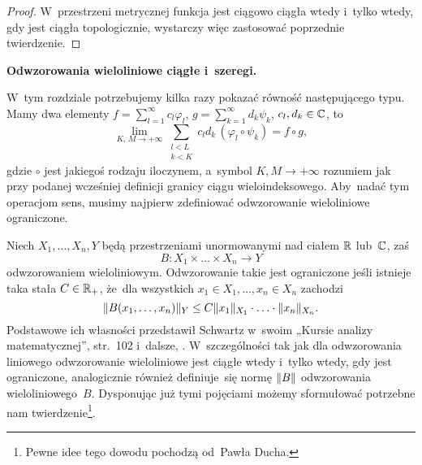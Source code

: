 \documentclass[a4paper,11pt]{article}
\numberwithin{equation}{section}
\begin{document}
\begin{proof}

  W~przestrzeni metrycznej funkcja jest ciągowo ciągła wtedy i~tylko wtedy,
  gdy jest ciągła topologicznie, wystarczy więc zastosować poprzednie
  twierdzenie.

\end{proof}

\VerSpaceFour



\textbf{Odwzorowania wieloliniowe ciągłe i~szeregi.}

W~tym
rozdziale potrzebujemy kilka razy pokazać równość następującego typu.
Mamy dwa elementy $f = \sum_{ l = 1 }^{ \infty } c_{ l } \varphi_{ l }$,
$g = \sum_{ k = 1 }^{ \infty } d_{ k } \psi_{ k }$,
$c_{ l }, d_{ k } \in \mathbb{C}$, to
\begin{equation}
  \label{eq:RS-Vol-I-s02-01}
  \lim\limits_{ K,\, M \to +\infty } \sum_{ \substack{ l < L \\ k < K } }
  c_{ l } d_{ k } \, ( \varphi_{ l } \circ \psi_{ k } ) = f \circ g,
\end{equation}
gdzie $\circ$ jest jakiegoś rodzaju iloczynem, a~symbol
$K, M \to +\infty$ rozumiem jak przy podanej wcześniej definicji
granicy ciągu wieloindeksowego. Aby~nadać tym operacjom sens, musimy
najpierw zdefiniować odwzorowanie wieloliniowe ograniczone.

Niech $X_{ 1 }, \ldots, X_{ n }, Y$ będą przestrzeniami unormowanymi nad
ciałem $\mathbb{R}$ lub~$\mathbb{C}$, zaś
\begin{equation}
  \label{eq:RS-Vol-I-s02-02}
  B: X_{ 1 } \times \ldots \times X_{ n } \to Y
\end{equation}
odwzorowaniem wieloliniowym. Odwzorowanie takie jest ograniczone jeśli
istnieje taka stała $C \in \mathbb{R}_{ + }$, że~dla wszystkich
$x_{ 1 } \in X_{ 1 }, \ldots, x_{ n } \in X_{ n }$ zachodzi
\begin{equation}
  \label{eq:RS-Vol-I-02-03}
  \lVert{  B( x_{ 1 }, \ldots, x_{ n } )  }\rVert_{ Y } \leq
  C \lVert{  x_{ 1 }  }\rVert_{ X_{ 1 } } \cdot \ldots \cdot \lVert{  x_{ n }  }\rVert_{ X_{ n } }.
\end{equation}
Podstawowe ich własności przedstawił Schwartz w~swoim „Kursie analizy
matematycznej”, str.~102 i~dalsze,
\parencite{Schwartz-Kurs-analizy-matematycznej-Vol-I-Pub-1979}.
W~szczególności tak jak dla odwzorowania liniowego odwzorowanie
wieloliniowe jest ciągłe wtedy i~tylko wtedy, gdy
jest ograniczone, analogicznie również definiuje~się normę
$\lVert{  B  }\rVert$ odwzorowania wieloliniowego~$B$. Dysponując już tymi
pojęciami możemy sformułować potrzebne nam twierdzenie\footnote{Pewne
  idee tego dowodu pochodzą od~Pawła Ducha.}.
\end{document}
